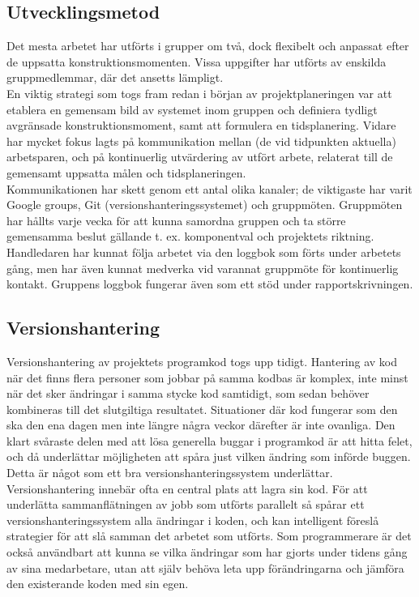 \documentclass[a4paper,11pt]{article}
\begin{document}
\subsection{Utvecklingsmetod}
Det mesta arbetet har utförts i grupper om två, dock flexibelt och anpassat efter de uppsatta konstruktionsmomenten. Vissa uppgifter har utförts av enskilda gruppmedlemmar, där det ansetts lämpligt. \\

En viktig strategi som togs fram redan i början av projektplaneringen var att etablera en gemensam bild av systemet inom gruppen och definiera tydligt avgränsade konstruktionsmoment, samt att formulera en tidsplanering. Vidare har mycket fokus lagts på kommunikation mellan (de vid tidpunkten aktuella) arbetsparen, och på kontinuerlig utvärdering av utfört arbete, relaterat till de gemensamt uppsatta målen och tidsplaneringen. \\

Kommunikationen har skett genom ett antal olika kanaler; de viktigaste har varit Google groups, Git (versionshanteringssystemet) och gruppmöten. Gruppmöten har hållts varje vecka för att kunna samordna gruppen och ta större gemensamma beslut gällande t. ex. komponentval och projektets riktning. Handledaren har kunnat följa arbetet via den loggbok som förts under arbetets gång, men har även kunnat medverka vid varannat gruppmöte för kontinuerlig kontakt. Gruppens loggbok fungerar även som ett stöd under rapportskrivningen.

\subsection{Versionshantering}
Versionshantering av projektets programkod togs upp tidigt. Hantering av kod när det finns flera personer som jobbar på samma kodbas är komplex, inte minst när det sker ändringar i samma stycke kod samtidigt, som sedan behöver kombineras till det slutgiltiga resultatet. Situationer där kod fungerar som den ska den ena dagen men inte längre några veckor därefter är inte ovanliga. Den klart svåraste delen med att lösa generella buggar i programkod är att hitta felet, och då underlättar möjligheten att spåra just vilken ändring som införde buggen. Detta är något som ett bra versionshanteringssystem underlättar. \\

Versionshantering innebär ofta en central plats att lagra sin kod. För att underlätta sammanflätningen av jobb som utförts parallelt så spårar ett versionshanteringssystem alla ändringar i koden, och kan intelligent föreslå strategier för att slå samman det arbetet som utförts. Som programmerare är det också användbart att kunna se vilka ändringar som har gjorts under tidens gång av sina medarbetare, utan att själv behöva leta upp förändringarna och jämföra den existerande koden med sin egen. \\
\end{document}
